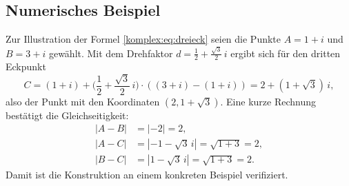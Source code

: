 \subsection{Numerisches Beispiel
\label{komplex:subsection:numerisches-beispiel}}
Zur Illustration der Formel \eqref{komplex:eq:dreieck}
seien die Punkte $A = 1 + i$ und $B = 3 + i$ gewählt.
Mit dem Drehfaktor $d = \tfrac{1}{2} + \tfrac{\!\sqrt{3}}{2} \, i$
ergibt sich für den dritten Eckpunkt
\begin{equation}
C
=
(1 + i) + \biggl( \frac{1}{2} + \frac{\!\sqrt{3}}{2} \, i \biggr) \cdot
( (3 + i) - (1 + i) )
=
2 + ( 1 + \!\sqrt{3} ) \, i ,
\label{komplex:eq:beispiel-c}
\end{equation}
also der Punkt mit den Koordinaten $(2, 1 + \!\sqrt{3})$.
Eine kurze Rechnung bestätigt die Gleichseitigkeit:
\begin{align*}
|A - B|
&=
|{-2}|
=
2 ,
\\
|A - C|
&=
|{-1} - \!\sqrt{3} \, i|
=
\!\sqrt{1 + 3}
=
2 ,
\\
|B - C|
&=
|1 - \!\sqrt{3} \, i|
=
\!\sqrt{1 + 3}
=
2 .
\end{align*}
Damit ist die Konstruktion an einem konkreten Beispiel verifiziert.
